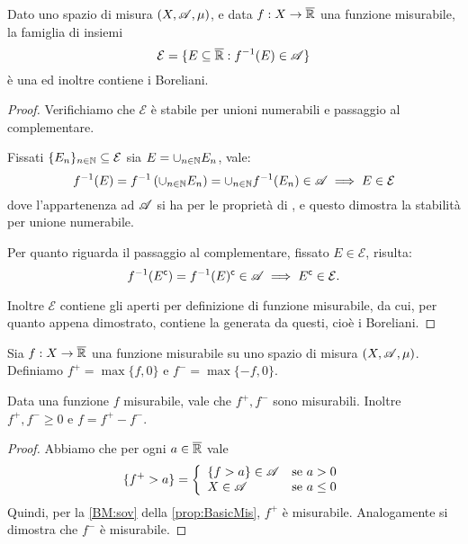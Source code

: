 \begin{proposition}\label{prop:CounterImgMis}
	Dato uno spazio di misura $(X,\mathscr A,\mu)$, e data $f:X\rightarrow \overline{\mathbb R}$ una funzione misurabile, la famiglia di insiemi
	\[
		\mathcal{E} = \{ E\subseteq \overline{\mathbb R} : f^{-1}(E)\in \mathscr A \}
	\]
	è una \sigalg{} ed inoltre contiene i Boreliani.
\end{proposition}
\begin{proof}
	Verifichiamo che $\mathcal E$ è stabile per unioni numerabili e passaggio al complementare.
	
	Fissati $\{E_n\}_{n\in \mathbb N}\subseteq \mathcal{E}$ sia $E = \cup_{n\in \mathbb N}E_n$, vale:
	\begin{equation*}
		f^{-1}(E)=f^{-1}\left(\cup_{n\in \mathbb N}E_n\right) = \cup_{n\in \mathbb N}f^{-1}(E_n)\in \mathscr A \implies E \in \mathcal{E}
	\end{equation*}
	dove l'appartenenza ad $\mathscr A$ si ha per le proprietà di \sigalg{}, e questo dimostra la stabilità per unione numerabile.
	
	Per quanto riguarda il passaggio al complementare, fissato $E\in \mathcal{E}$, risulta:
	\begin{equation*}
		f^{-1}(E^\mathsf{c})= f^{-1}(E)^\mathsf{c} \in \mathscr A \implies E^\mathsf{c} \in \mathcal{E}.
	\end{equation*}
	
	Inoltre $\mathcal E$ contiene gli aperti per definizione di funzione misurabile, da cui, per quanto appena dimostrato, contiene la \sigalg{} generata da questi, cioè i Boreliani.
\end{proof}

\begin{definition}\label{def:FpiuFmeno}
	Sia $f:X\to\overline{\mathbb R}$ una funzione misurabile su uno spazio di misura $(X,\mathscr A,\mu)$. Definiamo $f^+ = \max\{f,0\}$ e $f^- = \max\{-f,0\}$.
\end{definition}
\begin{remark}\label{nota:ProprietaFpiuFmeno}
	Data una funzione $f$ misurabile, vale che $f^+,f^-$ sono misurabili. Inoltre $f^+,f^-\ge 0$ e $f=f^+-f^-$. 
\end{remark}
\begin{proof}
	Abbiamo che per ogni $a\in\overline{\mathbb R}$ vale
	\begin{equation*}
		\{f^+>a\}=\left\{\begin{array}{ll}
			\{f>a\}\in\mathscr A &\text{se $a>0$}\\
			X\in\mathscr A &\text{se $a\le 0$}
	\end{array}\right.
	\end{equation*}
	Quindi, per la \ref{BM:sov} della \cref{prop:BasicMis}, $f^+$ è misurabile. Analogamente si dimostra che $f^-$ è misurabile.
\end{proof}


